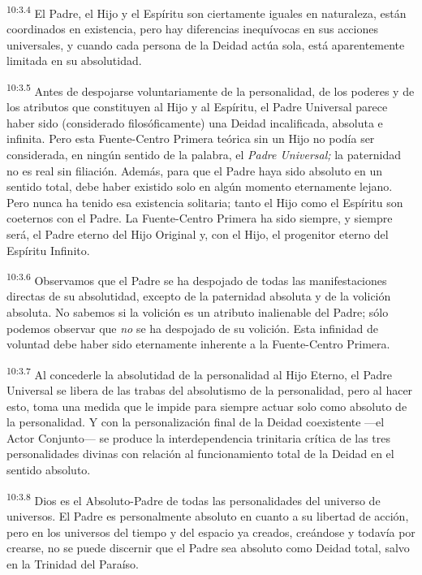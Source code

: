 \par
\textsuperscript{10:3.4} El Padre, el Hijo y el Espíritu son ciertamente iguales en naturaleza, están coordinados en existencia, pero hay diferencias inequívocas en sus acciones universales, y cuando cada persona de la Deidad actúa sola, está aparentemente limitada en su absolutidad.

\par
\textsuperscript{10:3.5} Antes de despojarse voluntariamente de la personalidad, de los poderes y de los atributos que constituyen al Hijo y al Espíritu, el Padre Universal parece haber sido (considerado filosóficamente) una Deidad incalificada, absoluta e infinita. Pero esta Fuente-Centro Primera teórica sin un Hijo no podía ser considerada, en ningún sentido de la palabra, el \textit{Padre Universal;} la paternidad no es real sin filiación. Además, para que el Padre haya sido absoluto en un sentido total, debe haber existido solo en algún momento eternamente lejano. Pero nunca ha tenido esa existencia solitaria; tanto el Hijo como el Espíritu son coeternos con el Padre. La Fuente-Centro Primera ha sido siempre, y siempre será, el Padre eterno del Hijo Original y, con el Hijo, el progenitor eterno del Espíritu Infinito.

\par
\textsuperscript{10:3.6} Observamos que el Padre se ha despojado de todas las manifestaciones directas de su absolutidad, excepto de la paternidad absoluta y de la volición absoluta. No sabemos si la volición es un atributo inalienable del Padre; sólo podemos observar que \textit{no} se ha despojado de su volición. Esta infinidad de voluntad debe haber sido eternamente inherente a la Fuente-Centro Primera.

\par
\textsuperscript{10:3.7} Al concederle la absolutidad de la personalidad al Hijo Eterno, el Padre Universal se libera de las trabas del absolutismo de la personalidad, pero al hacer esto, toma una medida que le impide para siempre actuar solo como absoluto de la personalidad. Y con la personalización final de la Deidad coexistente ---el Actor Conjunto--- se produce la interdependencia trinitaria crítica de las tres personalidades divinas con relación al funcionamiento total de la Deidad en el sentido absoluto.

\par
\textsuperscript{10:3.8} Dios es el Absoluto-Padre de todas las personalidades del universo de universos. El Padre es personalmente absoluto en cuanto a su libertad de acción, pero en los universos del tiempo y del espacio ya creados, creándose y todavía por crearse, no se puede discernir que el Padre sea absoluto como Deidad total, salvo en la Trinidad del Paraíso.

